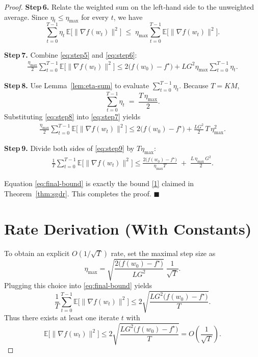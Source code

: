\documentclass{article}
\newcommand{\E}{\mathbb{E}}
\begin{document}
\begin{proof}
\bigskip
\noindent\textbf{Step 6.} Relate the weighted sum on the left‑hand side to the unweighted average.
Since $\eta_t\le\eta_{\max}$ for every $t$, we have
\[
\sum_{t=0}^{T-1}\eta_t\,\E\bigl[\|\nabla f(w_t)\|^2\bigr]
\;\le\;
\eta_{\max}\sum_{t=0}^{T-1}\E\bigl[\|\nabla f(w_t)\|^2\bigr].
\tag{7}\label{eq:step6}
\]

\bigskip
\noindent\textbf{Step 7.} Combine \eqref{eq:step5} and \eqref{eq:step6}:
\begin{align}
\frac{\eta_{\max}}{2}\sum_{t=0}^{T-1}\E\bigl[\|\nabla f(w_t)\|^2\bigr]
\le 
2\bigl(f(w_0)-f^\star\bigr) + L G^2 \eta_{\max}\sum_{t=0}^{T-1}\eta_t .
\tag{8}\label{eq:step7}
\end{align}

\bigskip
\noindent\textbf{Step 8.} Use Lemma~\ref{lem:eta-sum} to evaluate $\sum_{t=0}^{T-1}\eta_t$.
Because $T=KM$,
\[
\sum_{t=0}^{T-1}\eta_t \;=\; \frac{T\,\eta_{\max}}{2}.
\tag{9}\label{eq:step8}
\]
Substituting \eqref{eq:step8} into \eqref{eq:step7} yields
\begin{align}
\frac{\eta_{\max}}{2}\sum_{t=0}^{T-1}\E\bigl[\|\nabla f(w_t)\|^2\bigr]
\le 
2\bigl(f(w_0)-f^\star\bigr) + \frac{L G^2}{2}\,T\,\eta_{\max}^{2}.
\tag{10}\label{eq:step9}
\end{align}

\bigskip
\noindent\textbf{Step 9.} Divide both sides of \eqref{eq:step9} by $T\eta_{\max}$:
\begin{align}
\frac{1}{T}\sum_{t=0}^{T-1}\E\bigl[\|\nabla f(w_t)\|^2\bigr]
\le 
\frac{2\bigl(f(w_0)-f^\star\bigr)}{\eta_{\max}T}
\;+\;
\frac{L\,\eta_{\max}\,G^{2}}{2}.
\tag{11}\label{eq:final-bound}
\end{align}

Equation \eqref{eq:final-bound} is exactly the bound \eqref{1} claimed in
Theorem~\ref{thm:sgdr}. This completes the proof. \hfill $\blacksquare$

\section*{Rate Derivation (With Constants)}
To obtain an explicit $O(1/\sqrt{T})$ rate, set the maximal step size as
\[
\eta_{\max}= \sqrt{\frac{2\bigl(f(w_0)-f^\star\bigr)}{L G^2}}\; \frac{1}{\sqrt{T}} .
\]
Plugging this choice into \eqref{eq:final-bound} yields
\[
\frac{1}{T}\sum_{t=0}^{T-1}\E\bigl[\|\nabla f(w_t)\|^2\bigr]
\le 
2\sqrt{\frac{L G^2\bigl(f(w_0)-f^\star\bigr)}{T}} .
\]
Thus there exists at least one iterate $t$ with
\[
\E\bigl[\|\nabla f(w_t)\|^2\bigr]\le
2\sqrt{\frac{L G^2\bigl(f(w_0)-f^\star\bigr)}{T}}=O\!\left(\frac{1}{\sqrt{T}}\right).
\]


\end{proof}
\end{document}

